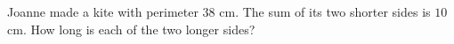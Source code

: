 Joanne made a kite with perimeter $38$ cm. The sum of its two shorter sides is $10$ cm. How long is each of the two longer sides?
